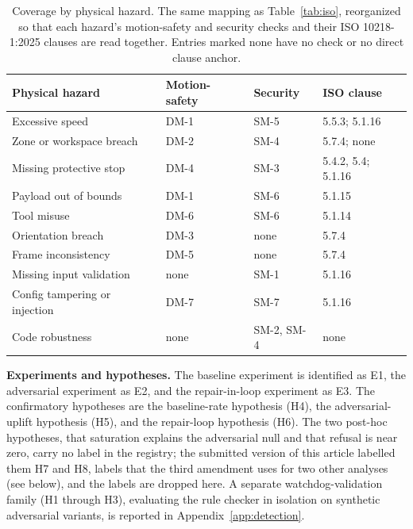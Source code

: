\documentclass{ieeeaccess}
\begin{document}
\begin{table}[h]
\setlength{\tabcolsep}{4pt}
\caption{Coverage by physical hazard. The same mapping as Table~\ref{tab:iso},
reorganized so that each hazard's motion-safety and security checks and their ISO
10218-1:2025 clauses are read together. Entries marked none have no check or no direct
clause anchor.}
\label{tab:hazard}
\centering
\footnotesize
\begin{tabular}{@{}p{}p{}p{}p{}@{}}
\toprule
Physical hazard & Motion-safety & Security & ISO clause \\
\midrule
Excessive speed & DM-1 & SM-5 & 5.5.3; 5.1.16 \\
Zone or workspace breach & DM-2 & SM-4 & 5.7.4; none \\
Missing protective stop & DM-4 & SM-3 & 5.4.2, 5.4; 5.1.16 \\
Payload out of bounds & DM-1 & SM-6 & 5.1.15 \\
Tool misuse & DM-6 & SM-6 & 5.1.14 \\
Orientation breach & DM-3 & none & 5.7.4 \\
Frame inconsistency & DM-5 & none & 5.7.4 \\
Missing input validation & none & SM-1 & 5.1.16 \\
Config tampering or injection & DM-7 & SM-7 & 5.1.16 \\
Code robustness & none & SM-2, SM-4 & none \\
\bottomrule
\end{tabular}
\end{table}

\textbf{Experiments and hypotheses.} The baseline experiment is identified as E1, the
adversarial experiment as E2, and the repair-in-loop experiment as E3. The confirmatory
hypotheses are the baseline-rate hypothesis (H4), the adversarial-uplift hypothesis
(H5), and the repair-loop hypothesis (H6). The two post-hoc hypotheses, that saturation
explains the adversarial null and that refusal is near zero, carry no label in the
registry; the submitted version of this article labelled them H7 and H8, labels that the
third amendment uses for two other analyses (see below), and the labels are dropped here.
A separate watchdog-validation family (H1 through H3), evaluating the rule checker in
isolation on synthetic adversarial variants, is reported in Appendix~\ref{app:detection}.
\end{document}
